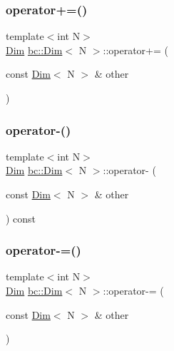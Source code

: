 \mbox{\label{structbc_1_1Dim_aa81e58af5e2bd8d6967bafc0d83210a4}} 
\subsubsection{\texorpdfstring{operator+=()}{operator+=()}}
{\footnotesize\ttfamily template$<$int N$>$ \\
\hyperlink{structbc_1_1Dim}{Dim} \hyperlink{structbc_1_1Dim}{bc\+::\+Dim}$<$ N $>$\+::operator+= (\begin{DoxyParamCaption}\item[{const \hyperlink{structbc_1_1Dim}{Dim}$<$ N $>$ \&}]{other }\end{DoxyParamCaption})\hspace{0.3cm}{\ttfamily [inline]}}

\mbox{\label{structbc_1_1Dim_a5f72a7916d7bf666e2569dccef8277a8}} 
\subsubsection{\texorpdfstring{operator-\/()}{operator-()}}
{\footnotesize\ttfamily template$<$int N$>$ \\
\hyperlink{structbc_1_1Dim}{Dim} \hyperlink{structbc_1_1Dim}{bc\+::\+Dim}$<$ N $>$\+::operator-\/ (\begin{DoxyParamCaption}\item[{const \hyperlink{structbc_1_1Dim}{Dim}$<$ N $>$ \&}]{other }\end{DoxyParamCaption}) const\hspace{0.3cm}{\ttfamily [inline]}}

\mbox{\label{structbc_1_1Dim_aebac2ecf4a2575ae37f3f95f1ebe3140}} 
\subsubsection{\texorpdfstring{operator-\/=()}{operator-=()}}
{\footnotesize\ttfamily template$<$int N$>$ \\
\hyperlink{structbc_1_1Dim}{Dim} \hyperlink{structbc_1_1Dim}{bc\+::\+Dim}$<$ N $>$\+::operator-\/= (\begin{DoxyParamCaption}\item[{const \hyperlink{structbc_1_1Dim}{Dim}$<$ N $>$ \&}]{other }\end{DoxyParamCaption})\hspace{0.3cm}{\ttfamily [inline]}}

